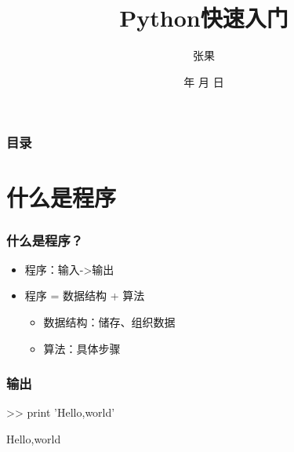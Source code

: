\documentclass[13pt]{beamer}
\begin{document}
\title{Python快速入门}


\author{张果}


\renewcommand{\today}{\number\year 年 \number\month 月 \number\day 日}
\date{\today}


\subject{Talks}




\begin{frame}
\titlepage
\end{frame}

\begin{frame}
\frametitle{目录}
\tableofcontents
\end{frame}


\section{什么是程序}

\begin{frame}
\frametitle{什么是程序？}
\begin{itemize}
  \item<1-> 程序：输入->输出
  \item<2-> 程序 = 数据结构 + 算法
  \begin{itemize}
    \item<3-> 数据结构：储存、组织数据
    \item<4-> 算法：具体步骤
  \end{itemize}
\end{itemize}
\end{frame}

\begin{frame}
\frametitle{输出}
\begin{python}

>> print 'Hello,world'

Hello,world

\end{python}
\end{frame}
\end{document}
